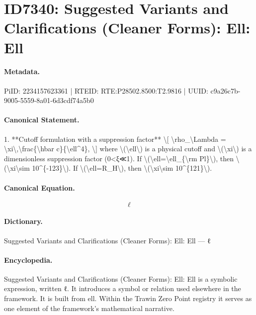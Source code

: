 \section*{ID7340: Suggested Variants and Clarifications (Cleaner Forms): Ell: Ell}
\paragraph{Metadata.}
PiID: 2234157623361 | RTEID: RTE:P28502.8500:T2.9816 | UUID: c9a26c7b-9005-5559-8a01-6d3cdf74a5b0

\paragraph{Canonical Statement.}
1. **Cutoff formulation with a suppression factor** \textbackslash{}[ \textbackslash{}rho\_\textbackslash{}Lambda = \textbackslash{}xi\textbackslash{},\textbackslash{}frac\{\textbackslash{}hbar c\}\{\textbackslash{}ell\textasciicircum{}4\}, \textbackslash{}] where \textbackslash{}(\textbackslash{}ell\textbackslash{}) is a physical cutoff and \textbackslash{}(\textbackslash{}xi\textbackslash{}) is a dimensionless suppression factor (0<ξ≪1). If \textbackslash{}(\textbackslash{}ell=\textbackslash{}ell\_\{\textbackslash{}rm Pl\}\textbackslash{}), then \textbackslash{}(\textbackslash{}xi\textbackslash{}sim 10\textasciicircum{}\{-123\}\textbackslash{}). If \textbackslash{}(\textbackslash{}ell=R\_H\textbackslash{}), then \textbackslash{}(\textbackslash{}xi\textbackslash{}sim 10\textasciicircum{}\{121\}\textbackslash{}).

\paragraph{Canonical Equation.}
\[
\ell
\]

\paragraph{Dictionary.}
Suggested Variants and Clarifications (Cleaner Forms): Ell: Ell — ℓ

\paragraph{Encyclopedia.}
Suggested Variants and Clarifications (Cleaner Forms): Ell: Ell is a symbolic expression, written ℓ. It introduces a symbol or relation used elsewhere in the framework. It is built from ell. Within the Trawin Zero Point registry it serves as one element of the framework's mathematical narrative.

